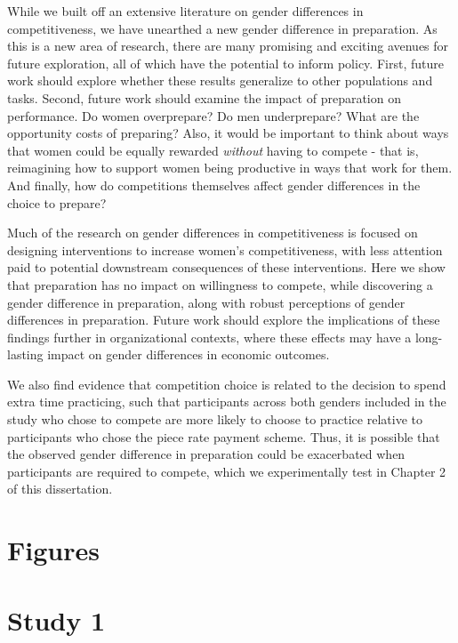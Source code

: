 \documentclass[a4paper,nobind]{templates/ociamthesis}
\begin{document}
While we built off an extensive literature on gender differences in competitiveness, we have unearthed a new gender difference in preparation. As this is a new area of research, there are many promising and exciting avenues for future exploration, all of which have the potential to inform policy. First, future work should explore whether these results generalize to other populations and tasks. Second, future work should examine the impact of preparation on performance. Do women overprepare? Do men underprepare? What are the opportunity costs of preparing? Also, it would be important to think about ways that women could be equally rewarded \emph{without} having to compete - that is, reimagining how to support women being productive in ways that work for them. And finally, how do competitions themselves affect gender differences in the choice to prepare?

Much of the research on gender differences in competitiveness is focused on designing interventions to increase women's competitiveness, with less attention paid to potential downstream consequences of these interventions. Here we show that preparation has no impact on willingness to compete, while discovering a gender difference in preparation, along with robust perceptions of gender differences in preparation. Future work should explore the implications of these findings further in organizational contexts, where these effects may have a long-lasting impact on gender differences in economic outcomes.

We also find evidence that competition choice is related to the decision to spend extra time practicing, such that participants across both genders included in the study who chose to compete are more likely to choose to practice relative to participants who chose the piece rate payment scheme. Thus, it is possible that the observed gender difference in preparation could be exacerbated when participants are required to compete, which we experimentally test in Chapter 2 of this dissertation.

\hypertarget{figures}{%
\section{Figures}\label{figures}}

\hypertarget{study-1-1}{%
\section{Study 1}\label{study-1-1}}
\end{document}

